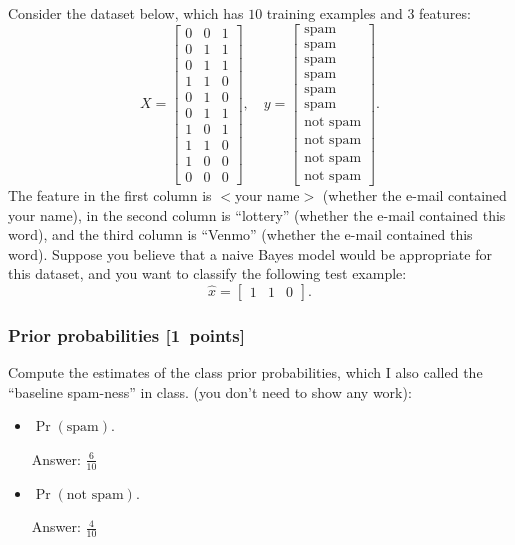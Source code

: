 \documentclass{article}
\newcommand{\blu}[1]{{\textcolor{blu}{#1}}}
\newenvironment{answer}{\par\begingroup\color{gre}Answer: }{\endgroup}
\let\ask\blu
\newcommand\pts[1]{\textcolor{pointscolour}{[#1~points]}}
\begin{document}
    Consider the dataset below, which has $10$ training examples and $3$ features:
    \[
    X = \begin{bmatrix}
        0 & 0 & 1\\
        0 & 1 & 1\\
        0 & 1 & 1\\
        1 & 1 & 0\\
        0 & 1 & 0\\
        0 & 1 & 1\\
        1 & 0 & 1\\
        1 & 1 & 0\\
        1 & 0 & 0\\
        0 & 0 & 0
    \end{bmatrix},
    \quad y = \begin{bmatrix}
        \text{spam}\\
        \text{spam}\\
        \text{spam}\\
        \text{spam}\\
        \text{spam}\\
        \text{spam}\\
        \text{not spam}\\
        \text{not spam}\\
        \text{not spam}\\
        \text{not spam}
    \end{bmatrix}.
    \]
    The feature in the first column is $<$your name$>$ (whether the e-mail contained your name), in the second column is ``lottery'' (whether the e-mail contained this word), and the third column is ``Venmo'' (whether the e-mail contained this word).
    Suppose you believe that a naive Bayes model would be appropriate for this dataset, and you want to classify the following test example:
    \[
    \hat{x} = \begin{bmatrix}1 & 1 & 0\end{bmatrix}.
    \]

    \subsubsection{Prior probabilities \pts{1}}
    \ask{Compute the estimates of the class prior probabilities, which I also called the ``baseline spam-ness'' in class.} (you don't need to show any work):
    \begin{itemize}
        \item $\Pr(\text{spam})$.
        \begin{answer}
            $\frac{6}{10}$
        \end{answer}
        \item $\Pr(\text{not spam})$.
        \begin{answer}
            $\frac{4}{10}$
        \end{answer}
    \end{itemize}
\end{document}
